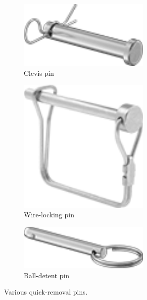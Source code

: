 \documentclass[10pt,letterpaper]{book}
\begin{document}
	\begin{figure}[H]
		\centering
		\begin{subfigure}[b]{.32\linewidth}
			\includegraphics[width=0.7\textwidth]{imgs/cpin.png}
			\caption{Clevis pin}
		\end{subfigure}\begin{subfigure}[b]{.32\linewidth}
			\includegraphics[width=0.7\textwidth]{imgs/wlpin.png}
			\caption{Wire-locking pin}
		\end{subfigure}\begin{subfigure}[b]{.32\linewidth}
			\includegraphics[width=0.7\textwidth]{imgs/bdpin.png}
			\caption{Ball-detent pin}
		\end{subfigure}
		\caption{Various quick-removal pins.}
	\end{figure}
	
\end{document}
